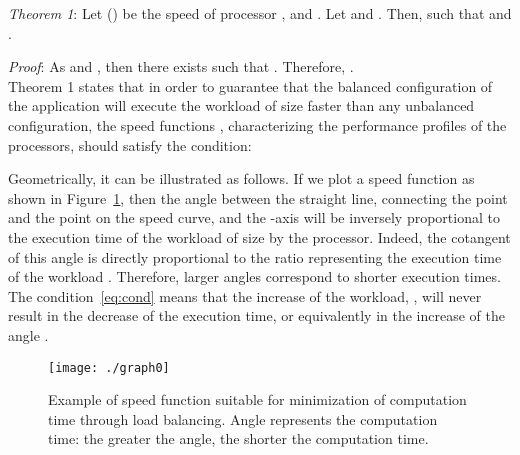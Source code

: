 \documentclass{acm_proc_article-sp}
\begin{document}
\emph{Theorem 1}:
\label{theo:speed} 
Let  () be the speed of processor , and    . Let  and   . Then,    such that    and    .

\emph{Proof}: 
As     and , then there exists  such that . Therefore,         .\\

Theorem 1 states that in order to guarantee that the balanced configuration of the application will execute the workload of size  faster than any unbalanced configuration, the speed functions  , characterizing the performance profiles of the processors, should satisfy the condition:


Geometrically, it can be illustrated as follows. If we plot a speed function as shown in Figure~\ref{fig:graph0}, then the angle  between the straight line, connecting the point  and the point  on the speed curve, and the -axis will be inversely proportional to the execution time of the workload of size  by the processor. Indeed, the cotangent of this angle is directly proportional to the ratio  representing the execution time of the workload . Therefore, larger angles correspond to shorter execution times. The condition~\ref{eq:cond} means that the increase of the workload, , will never result in the decrease of the execution time, or equivalently in the increase of the angle .

\begin{figure}[h]
\begin{center}
\texttt{[image: ./graph0]}
\caption{Example of speed function suitable for minimization of computation time through load balancing. Angle  represents the computation time: the greater the angle, the shorter the computation time.}
\label{fig:graph0}
\end{center}
\end{figure} 
\end{document}
